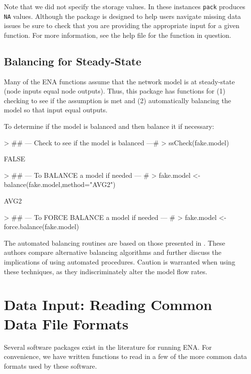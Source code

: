 \documentclass[11pt]{article}
\begin{document}
Note that we did not specify the storage values. In these instances
\texttt{pack} produces \texttt{NA} values. Although the package is
designed to help users navigate missing data issues be sure to check that you
are providing the appropriate input for a given function. For more
information, see the help file for the function in question.

\subsection{Balancing for Steady-State}

Many of the ENA functions assume that the network model is at
steady-state (node inputs equal node outputs).  Thus, this package has
functions for (1) checking to see if the assumption is met and (2)
automatically balancing the model so that input equal outputs.

To determine if the model is balanced and then balance it if necessary:
\begin{Schunk}
\begin{Sinput}
> ## --- Check to see if the model is balanced ---#
> ssCheck(fake.model)
\end{Sinput}
\begin{Soutput}
[1] FALSE
\end{Soutput}
\begin{Sinput}
> ## --- To BALANCE a model if needed --- #
> fake.model <- balance(fake.model,method="AVG2")  
\end{Sinput}
\begin{Soutput}
[1] AVG2
\end{Soutput}
\begin{Sinput}
> ## --- To FORCE BALANCE a model if needed --- #
> fake.model <- force.balance(fake.model)
\end{Sinput}
\end{Schunk}

The automated balancing routines are based on those presented in
\citet{allesina03}.  These authors compare alternative balancing
algorithms and further discuss the implications of using automated
procedures.  Caution is warranted when using these techniques, as they
indiscriminately alter the model flow rates.    

\section{Data Input: Reading Common Data File Formats}
Several software packages exist in the literature for running ENA.  For
convenience, we have written functions to read in a few of the more
common data formats used by these software. 
\end{document}
